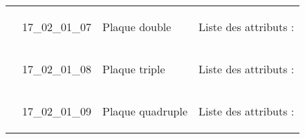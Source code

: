 \documentclass[12pt,titlepage]{book}
\begin{document}
\begin{supertabular}{|p{10cm}|c|p{13cm}|p{12cm}|}
                    & 17\_02\_01\_07 & Plaque double & Liste des attributs :
\begin{enumerate}
\end{enumerate}
\\


                    & 17\_02\_01\_08 & Plaque triple & Liste des attributs :
\begin{enumerate}
\end{enumerate}
\\


                    & 17\_02\_01\_09 & Plaque quadruple & Liste des attributs :
\begin{enumerate}
\end{enumerate}
\\
\hline
\end{supertabular}
\end{document}
